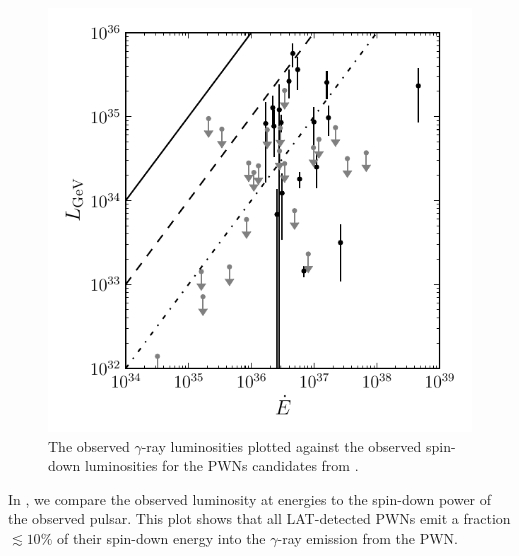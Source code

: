 \begin{figure}[htbp]
  \centering
  \includegraphics{chapters/population_study/figures/pwn_luminosity_vs_edot.pdf}
  \caption{The observed $\gamma$-ray luminosities plotted against the
  observed spin-down luminosities for the \acp{PWN} candidates from
  .}
\end{figure}

In , we compare the observed luminosity at
\gev energies to the spin-down power of the observed pulsar.  This plot
shows that all \ac{LAT}-detected \acp{PWN} emit a fraction $\lesssim
10\%$ of their spin-down energy into the $\gamma$-ray emission from
the \ac{PWN}.


